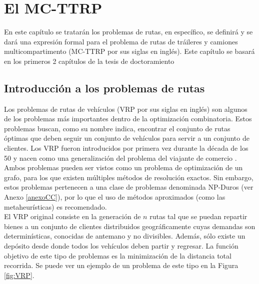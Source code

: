 \chapter{El MC-TTRP}
En este capítulo se tratarán los problemas de rutas, en específico, se definirá y se dará una expresión formal para el problema de rutas de tráileres y camiones multicompartimento (MC-TTRP por sus siglas en inglés). Este capítulo se basará en los primeros 2 capítulos de la tesis de doctoramiento \cite{laura-mcttrp}
\section{Introducción a los problemas de rutas}
Los problemas de rutas de vehículos (VRP por sus siglas en inglés) son algunos de los problemas más importantes dentro de la optimización combinatoria. Estos problemas buscan, como su nombre indica, encontrar el conjunto de rutas óptimas que deben seguir un conjunto de vehículos para servir a un conjunto de clientes. Los VRP fueron introducidos por primera vez durante la década de los 50 \cite{vrp-og} y nacen como una generalización del problema del viajante de comercio \cite{tsp-dantzig}. Ambos problemas pueden ser vistos como un problema de optimización de un grafo, para los que existen múltiples métodos de resolución exactos. Sin embargo, estos problemas pertenecen a una clase de problemas denominada NP-Duros (ver Anexo \ref{anexoCC}), por lo que el uso de métodos aproximados (como las metaheurísticas) es recomendado.\\

El VRP original consiste en la generación de $n$ rutas tal que se puedan repartir bienes a un conjunto de clientes distribuidos geográficamente cuyas demandas son determinísticas, conocidas de antemano y no divisibles. Además, sólo existe un depósito desde donde todos los vehículos deben partir y regresar. La función objetivo de este tipo de problemas es la minimización de la distancia total recorrida. Se puede ver un ejemplo de un problema de este tipo en la Figura \ref{fig:VRP}.\\

